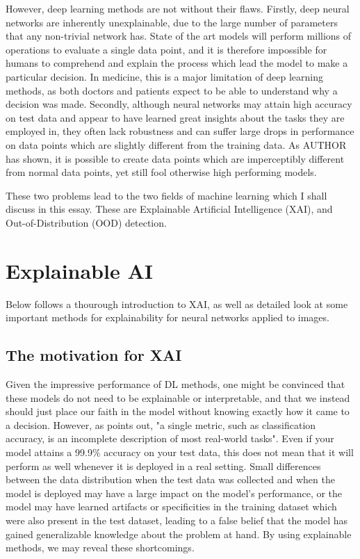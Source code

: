 \documentclass[conference]{IEEEtran}
\begin{document}
However, deep learning methods are not without their flaws. Firstly, deep neural networks are inherently unexplainable, due to the large number of parameters that any non-trivial network has. State of the art models will perform millions of operations to evaluate a single data point, and it is therefore impossible for humans to comprehend and explain the process which lead the model to make a particular decision. In medicine, this is a major limitation of deep learning methods, as both doctors and patients expect to be able to understand why a decision was made. Secondly, although neural networks may attain high accuracy on test data and appear to have learned great insights about the tasks they are employed in, they often lack robustness and can suffer large drops in performance on data points which are slightly different from the training data. As AUTHOR has shown, it is possible to create data points which are imperceptibly different from normal data points, yet still fool otherwise high performing models.

These two problems lead to the two fields of machine learning which I shall discuss in this essay. These are Explainable Artificial Intelligence (XAI), and Out-of-Distribution (OOD) detection.

\section{Explainable AI}

Below follows a thourough introduction to XAI, as well as detailed look at some important methods for explainability for neural networks applied to images.

\subsection{The motivation for XAI}

Given the impressive performance of DL methods, one might be convinced that these models do not need to be explainable or interpretable, and that we instead should just place our faith in the model without knowing exactly how it came to a decision. However, as \cite{doshivelez} points out, "a single metric, such as classification accuracy, is an incomplete description of most real-world tasks". Even if your model attains a 99.9\% accuracy on your test data, this does not mean that it will perform as well whenever it is deployed in a real setting. Small differences between the data distribution when the test data was collected and when the model is deployed may have a large impact on the model's performance, or the model may have learned artifacts or specificities in the training dataset which were also present in the test dataset, leading to a false belief that the model has gained generalizable knowledge about the problem at hand. By using explainable methods, we may reveal these shortcomings.
\end{document}
